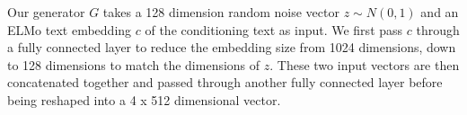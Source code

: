 Our generator $G$ takes a 128 dimension random noise vector $z \sim N(0, 1)$ and an ELMo text embedding $c$ of the conditioning text as input. We first  pass $c$ through a fully connected layer to reduce the embedding size from 1024 dimensions, down to 128 dimensions to match the dimensions of $z$. These two input vectors are then concatenated together and passed through another fully connected layer before being reshaped into a 4 x 512 dimensional vector.